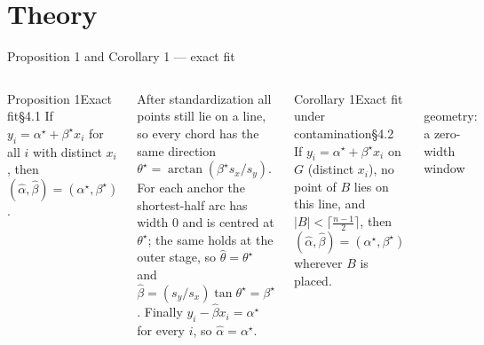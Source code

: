 \documentclass[aspectratio=169,9pt]{beamer}
\newcommand{\cR}{2.0}
\newcommand{\projcircle}[1][30]{%
  \draw[mute,line width=0.9pt] (0,0) circle (\cR);
  \foreach \a in {0,#1,...,150}{%
    \draw[mute] ({(\cR-0.05)*cos(2*\a)},{(\cR-0.05)*sin(2*\a)}) -- ({(\cR+0.05)*cos(2*\a)},{(\cR+0.05)*sin(2*\a)});
    \node[font=\sffamily\tiny,mute] at ({(\cR+0.3)*cos(2*\a)},{(\cR+0.3)*sin(2*\a)}) {$\a^\circ$};}}
\begin{document}
\section{Theory}
\begin{frame}{Proposition 1 and Corollary 1 --- exact fit}
\begin{columns}[T]
\begin{rthm}{Proposition 1}{Exact fit}{\S4.1}
If $y_i=\alpha^\star+\beta^\star x_i$ for all $i$ with distinct $x_i$, then $(\hat\alpha,\hat\beta)=(\alpha^\star,\beta^\star)$.
\end{rthm}
\begin{rproof}
After standardization all points still lie on a line, so every chord has the same direction $\theta^\star=\arctan(\beta^\star s_x/s_y)$. For each anchor the shortest-half arc has width $0$ and is centred at $\theta^\star$; the same holds at the outer stage, so $\hat\theta=\theta^\star$ and $\hat\beta=(s_y/s_x)\tan\theta^\star=\beta^\star$. Finally $y_i-\hat\beta x_i=\alpha^\star$ for every $i$, so $\hat\alpha=\alpha^\star$.
\end{rproof}
\begin{rthm}{Corollary 1}{Exact fit under contamination}{\S4.2}
If $y_i=\alpha^\star+\beta^\star x_i$ on $G$ (distinct $x_i$), no point of $B$ lies on this line, and $|B|<\lceil\tfrac{n-1}{2}\rceil$, then $(\hat\alpha,\hat\beta)=(\alpha^\star,\beta^\star)$ wherever $B$ is placed.
\end{rthm}
\centering
{}\\[2pt]
{\sffamily\scriptsize\color{mute}geometry: a zero-width window}
\end{columns}
\end{frame}
\end{document}
